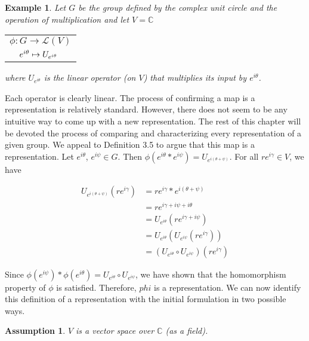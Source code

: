 \documentclass[10pt]{ucthesis}
\newtheorem{example}[definition]{Example}
\newtheorem{assumption}[definition]{Assumption}
\begin{document}
\begin{example}
	Let $G$ be the group defined by the complex unit circle and the operation of multiplication and let $V = \mathbb{C}$ 
	\begin{center}
		 \begin{tabular}{l}$\phi:G\rightarrow \mathcal{L}(V)$\\
				$\hspace{4mm}e^{i\theta}\mapsto U_{e^{i\theta}}$
		\end{tabular}
	\end{center}
	where $U_{e^{i\theta}}$ is the linear operator (on $V$) that multiplies its input by $e^{i\theta}$. 
\end{example}

Each operator is clearly linear. The process of confirming a map is a representation is relatively standard. However, there does not seem to be any intuitive way to come up with a new representation. The rest of this chapter will be devoted the process of comparing and characterizing every representation of a given group. We appeal to Definition 3.5 to argue that this map is a representation. Let $e^{i\theta}$, $e^{i\psi} \in G$. Then $\phi(e^{i\theta} * e^{i\psi}) = U_{e^{i(\theta+\psi)}}$. For all $re^{i\gamma} \in V$, we have

	\begin{equation}
		\begin{aligned}
			U_{e^{i(\theta+\psi)}}(re^{i\gamma}) &= re^{i\gamma} * e^{i(\theta+\psi)} \\
										&= re^{i\gamma + i\psi + i\theta} \\
										&= U_{e^{i\theta}}(re^{i\gamma + i\psi}) \\
										&= U_{e^{i\theta}}(U_{e^{i\psi}}(re^{i\gamma})) \\
										&= (U_{e^{i\theta}}\circ U_{e^{i\psi}}) (re^{i\gamma})
		\end{aligned}
	\end{equation}

Since $\phi(e^{i\psi})*\phi(e^{i\theta}) = U_{e^{i\theta}}\circ U_{e^{i\psi}}$, we have shown that the homomorphism property of $\phi$ is satisfied. Therefore, $phi$ is a representation. We can now identify this definition of a representation with the initial formulation in two possible ways.

\begin{assumption}
	$V$ is a vector space over $\mathbb{C}$ (as a field). 
\end{assumption}
\end{document}
